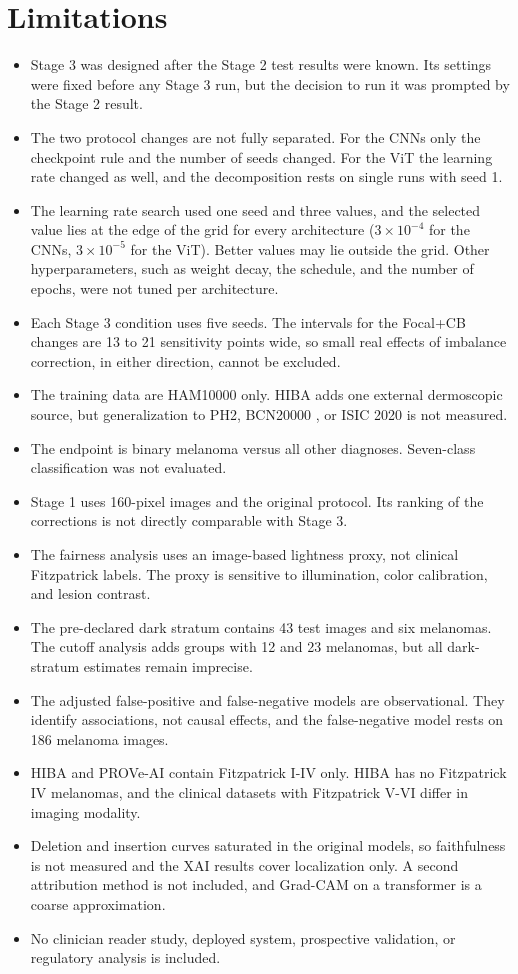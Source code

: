 \section{Limitations}

\begin{itemize}
  \item Stage 3 was designed after the Stage 2 test results were known. Its settings were fixed before any Stage 3 run, but the decision to run it was prompted by the Stage 2 result.
  \item The two protocol changes are not fully separated. For the CNNs only the checkpoint rule and the number of seeds changed. For the ViT the learning rate changed as well, and the decomposition rests on single runs with seed 1.
  \item The learning rate search used one seed and three values, and the selected value lies at the edge of the grid for every architecture ($3\times10^{-4}$ for the CNNs, $3\times10^{-5}$ for the ViT). Better values may lie outside the grid. Other hyperparameters, such as weight decay, the schedule, and the number of epochs, were not tuned per architecture.
  \item Each Stage 3 condition uses five seeds. The intervals for the Focal+CB changes are 13 to 21 sensitivity points wide, so small real effects of imbalance correction, in either direction, cannot be excluded.
  \item The training data are HAM10000 only. HIBA adds one external dermoscopic source, but generalization to PH2, BCN20000 \citep{combalia2019bcn20000}, or ISIC 2020 is not measured.
  \item The endpoint is binary melanoma versus all other diagnoses. Seven-class classification was not evaluated.
  \item Stage 1 uses 160-pixel images and the original protocol. Its ranking of the corrections is not directly comparable with Stage 3.
  \item The fairness analysis uses an image-based lightness proxy, not clinical Fitzpatrick labels. The proxy is sensitive to illumination, color calibration, and lesion contrast.
  \item The pre-declared dark stratum contains 43 test images and six melanomas. The cutoff analysis adds groups with 12 and 23 melanomas, but all dark-stratum estimates remain imprecise.
  \item The adjusted false-positive and false-negative models are observational. They identify associations, not causal effects, and the false-negative model rests on 186 melanoma images.
  \item HIBA and PROVe-AI contain Fitzpatrick I-IV only. HIBA has no Fitzpatrick IV melanomas, and the clinical datasets with Fitzpatrick V-VI differ in imaging modality.
  \item Deletion and insertion curves saturated in the original models, so faithfulness is not measured and the XAI results cover localization only. A second attribution method is not included, and Grad-CAM on a transformer is a coarse approximation.
  \item No clinician reader study, deployed system, prospective validation, or regulatory analysis is included.
\end{itemize}
